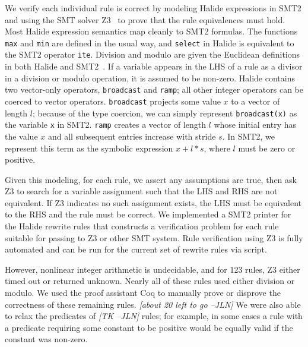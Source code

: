 \documentclass[sigplan,10pt,review,anonymous]{acmart}\settopmatter{printfolios=true,printccs=false,printacmref=false}
\newcommand{\jln}[1]{\textcolor{uwpurple}{\textit{[{#1} --JLN]}}}
\begin{document}
We verify each individual rule is correct by modeling Halide expressions in SMT2
and using the SMT solver Z3~\cite{de2008z3} to prove that the rule equivalences must hold.
Most Halide expression semantics map cleanly
to SMT2 formulas. The functions \texttt{max} and \texttt{min} are defined in
the usual way, and \texttt{select} in Halide is equivalent to the SMT2 operator
\texttt{ite}. Division and modulo are given the Euclidean definitions in both
Halide and SMT2~\cite{boute1992euclidean}. If a variable appears in the LHS of a rule as a divisor in a
division or modulo operation, it is assumed to be non-zero. %
Halide contains two vector-only operators, \texttt{broadcast} and \texttt{ramp}; all
other integer operators can be coerced to vector operators. 
\texttt{broadcast} projects some value $x$ to a vector of length $l$; because of
the type coercion, we can simply represent \texttt{broadcast(x)} as the variable
\texttt{x} in SMT2. \texttt{ramp} creates a vector of length $l$
whose initial entry has the value $x$ and all subsequent entries increase with
stride $s$. In SMT2, we represent this term as the symbolic expression $x + l *
s$, where $l$ must be zero or positive.

Given this modeling, for each rule, we assert any assumptions are true, then
ask Z3 to search for a variable assignment such that the LHS and RHS are not
equivalent.  If Z3 indicates no such assignment exists, the LHS must be equivalent to
the RHS and the rule must be correct. We implemented a SMT2 printer for the
Halide rewrite rules that constructs a verification problem for each rule
suitable for passing to Z3 or other SMT system.  Rule verification using Z3 is fully automated
and can be run for the current set of rewrite rules via script.

However, nonlinear integer arithmetic is undecidable, and for 123
rules, Z3 either timed out or returned unknown. Nearly all of these rules used
either division or modulo. We used the proof assistant Coq to manually prove or
disprove the correctness of these remaining rules. \jln{about 20 left to go} We
were also able to relax the predicates of \jln{TK} rules; for example, in some cases a rule
with a predicate requiring some constant to be positive would be equally valid
if the constant was non-zero.
\end{document}
